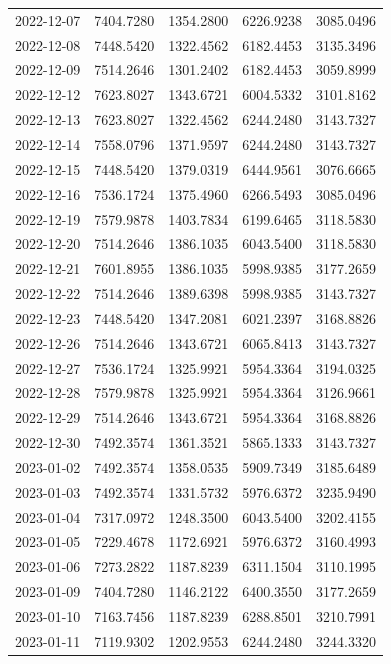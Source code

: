 \begin{footnotesize}
\begin{longtable}{lllll}
2022-12-07 & 7404.7280 & 1354.2800 & 6226.9238 & 3085.0496 \\
2022-12-08 & 7448.5420 & 1322.4562 & 6182.4453 & 3135.3496 \\
2022-12-09 & 7514.2646 & 1301.2402 & 6182.4453 & 3059.8999 \\
2022-12-12 & 7623.8027 & 1343.6721 & 6004.5332 & 3101.8162 \\
2022-12-13 & 7623.8027 & 1322.4562 & 6244.2480 & 3143.7327 \\
2022-12-14 & 7558.0796 & 1371.9597 & 6244.2480 & 3143.7327 \\
2022-12-15 & 7448.5420 & 1379.0319 & 6444.9561 & 3076.6665 \\
2022-12-16 & 7536.1724 & 1375.4960 & 6266.5493 & 3085.0496 \\
2022-12-19 & 7579.9878 & 1403.7834 & 6199.6465 & 3118.5830 \\
2022-12-20 & 7514.2646 & 1386.1035 & 6043.5400 & 3118.5830 \\
2022-12-21 & 7601.8955 & 1386.1035 & 5998.9385 & 3177.2659 \\
2022-12-22 & 7514.2646 & 1389.6398 & 5998.9385 & 3143.7327 \\
2022-12-23 & 7448.5420 & 1347.2081 & 6021.2397 & 3168.8826 \\
2022-12-26 & 7514.2646 & 1343.6721 & 6065.8413 & 3143.7327 \\
2022-12-27 & 7536.1724 & 1325.9921 & 5954.3364 & 3194.0325 \\
2022-12-28 & 7579.9878 & 1325.9921 & 5954.3364 & 3126.9661 \\
2022-12-29 & 7514.2646 & 1343.6721 & 5954.3364 & 3168.8826 \\
2022-12-30 & 7492.3574 & 1361.3521 & 5865.1333 & 3143.7327 \\
2023-01-02 & 7492.3574 & 1358.0535 & 5909.7349 & 3185.6489 \\
2023-01-03 & 7492.3574 & 1331.5732 & 5976.6372 & 3235.9490 \\
2023-01-04 & 7317.0972 & 1248.3500 & 6043.5400 & 3202.4155 \\
2023-01-05 & 7229.4678 & 1172.6921 & 5976.6372 & 3160.4993 \\
2023-01-06 & 7273.2822 & 1187.8239 & 6311.1504 & 3110.1995 \\
2023-01-09 & 7404.7280 & 1146.2122 & 6400.3550 & 3177.2659 \\
2023-01-10 & 7163.7456 & 1187.8239 & 6288.8501 & 3210.7991 \\
2023-01-11 & 7119.9302 & 1202.9553 & 6244.2480 & 3244.3320 \\

\end{longtable}
\end{footnotesize}
